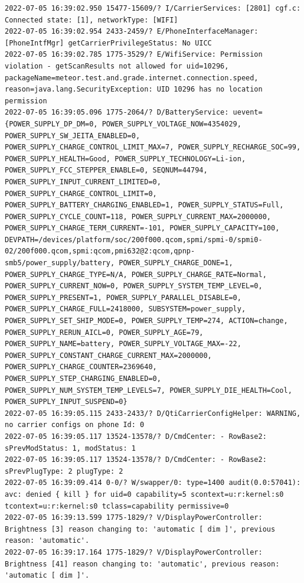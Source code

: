 \documentclass[a4paper,12pt]{book}
\begin{document}
\begin{lstlisting}
2022-07-05 16:39:02.950 15477-15609/? I/CarrierServices: [2801] cgf.c: Connected state: [1], networkType: [WIFI]
2022-07-05 16:39:02.954 2433-2459/? E/PhoneInterfaceManager: [PhoneIntfMgr] getCarrierPrivilegeStatus: No UICC
2022-07-05 16:39:02.785 1775-3529/? E/WifiService: Permission violation - getScanResults not allowed for uid=10296, packageName=meteor.test.and.grade.internet.connection.speed, reason=java.lang.SecurityException: UID 10296 has no location permission
2022-07-05 16:39:05.096 1775-2064/? D/BatteryService: uevent={POWER_SUPPLY_DP_DM=0, POWER_SUPPLY_VOLTAGE_NOW=4354029, POWER_SUPPLY_SW_JEITA_ENABLED=0, POWER_SUPPLY_CHARGE_CONTROL_LIMIT_MAX=7, POWER_SUPPLY_RECHARGE_SOC=99, POWER_SUPPLY_HEALTH=Good, POWER_SUPPLY_TECHNOLOGY=Li-ion, POWER_SUPPLY_FCC_STEPPER_ENABLE=0, SEQNUM=44794, POWER_SUPPLY_INPUT_CURRENT_LIMITED=0, POWER_SUPPLY_CHARGE_CONTROL_LIMIT=0, POWER_SUPPLY_BATTERY_CHARGING_ENABLED=1, POWER_SUPPLY_STATUS=Full, POWER_SUPPLY_CYCLE_COUNT=118, POWER_SUPPLY_CURRENT_MAX=2000000, POWER_SUPPLY_CHARGE_TERM_CURRENT=-101, POWER_SUPPLY_CAPACITY=100, DEVPATH=/devices/platform/soc/200f000.qcom,spmi/spmi-0/spmi0-02/200f000.qcom,spmi:qcom,pmi632@2:qcom,qpnp-smb5/power_supply/battery, POWER_SUPPLY_CHARGE_DONE=1, POWER_SUPPLY_CHARGE_TYPE=N/A, POWER_SUPPLY_CHARGE_RATE=Normal, POWER_SUPPLY_CURRENT_NOW=0, POWER_SUPPLY_SYSTEM_TEMP_LEVEL=0, POWER_SUPPLY_PRESENT=1, POWER_SUPPLY_PARALLEL_DISABLE=0, POWER_SUPPLY_CHARGE_FULL=2418000, SUBSYSTEM=power_supply, POWER_SUPPLY_SET_SHIP_MODE=0, POWER_SUPPLY_TEMP=274, ACTION=change, POWER_SUPPLY_RERUN_AICL=0, POWER_SUPPLY_AGE=79, POWER_SUPPLY_NAME=battery, POWER_SUPPLY_VOLTAGE_MAX=-22, POWER_SUPPLY_CONSTANT_CHARGE_CURRENT_MAX=2000000, POWER_SUPPLY_CHARGE_COUNTER=2369640, POWER_SUPPLY_STEP_CHARGING_ENABLED=0, POWER_SUPPLY_NUM_SYSTEM_TEMP_LEVELS=7, POWER_SUPPLY_DIE_HEALTH=Cool, POWER_SUPPLY_INPUT_SUSPEND=0}
2022-07-05 16:39:05.115 2433-2433/? D/QtiCarrierConfigHelper: WARNING, no carrier configs on phone Id: 0
2022-07-05 16:39:05.117 13524-13578/? D/CmdCenter: - RowBase2: sPrevModStatus: 1, modStatus: 1
2022-07-05 16:39:05.117 13524-13578/? D/CmdCenter: - RowBase2: sPrevPlugType: 2 plugType: 2
2022-07-05 16:39:09.414 0-0/? W/swapper/0: type=1400 audit(0.0:57041): avc: denied { kill } for uid=0 capability=5 scontext=u:r:kernel:s0 tcontext=u:r:kernel:s0 tclass=capability permissive=0
2022-07-05 16:39:13.599 1775-1829/? V/DisplayPowerController: Brightness [3] reason changing to: 'automatic [ dim ]', previous reason: 'automatic'.
2022-07-05 16:39:17.164 1775-1829/? V/DisplayPowerController: Brightness [41] reason changing to: 'automatic', previous reason: 'automatic [ dim ]'.

\end{lstlisting}
\end{document}
